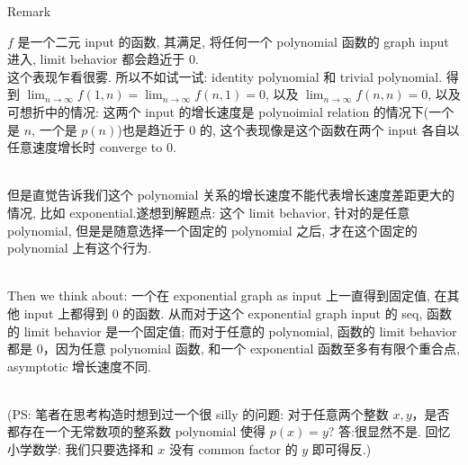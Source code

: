 \documentclass{qlnotes-export}
\begin{document}
\begin{qlremark}{Remark}

\(f\) 是一个二元 input 的函数, 其满足, 将任何一个 polynomial 函数的 graph input 进入, limit behavior 都会趋近于 0.\\
这个表现乍看很雾. 所以不如试一试: identity polynomial 和 trivial polynomial. 得到 \(\lim_{n\rightarrow\infty}f(1,n) = \lim_{n\rightarrow\infty}f(n,1) = 0\), 以及 \(\lim_{n\rightarrow\infty}f(n,n) = 0\), 以及可想折中的情况: 这两个 input 的增长速度是 polynoimial relation 的情况下(一个是 \(n\), 一个是 \(p(n)\))也是趋近于 0 的, 这个表现像是这个函数在两个 input 各自以任意速度增长时 converge to 0.\\
\strut \\
但是直觉告诉我们这个 polynomial 关系的增长速度不能代表增长速度差距更大的情况, 比如 exponential.遂想到解题点: 这个 limit behavior, 针对的是任意 polynomial, 但是是随意选择一个固定的 polynomial 之后, 才在这个固定的 polynomial 上有这个行为.\\
\strut \\
Then we think about: 一个在 exponential graph as input 上一直得到固定值, 在其他 input 上都得到 0 的函数. 从而对于这个 exponential graph input 的 seq, 函数的 limit behavior 是一个固定值; 而对于任意的 polynomial, 函数的 limit behavior 都是 0，因为任意 polynomial 函数, 和一个 exponential 函数至多有有限个重合点, asymptotic 增长速度不同.\\
\strut \\
(PS: 笔者在思考构造时想到过一个很 silly 的问题: 对于任意两个整数 \(x,y\)，是否都存在一个无常数项的整系数 polynomial 使得 \(p(x) = y\)? 答:很显然不是. 回忆小学数学: 我们只要选择和 \(x\) 没有 common factor 的 \(y\) 即可得反.)

\end{qlremark}
\end{document}
